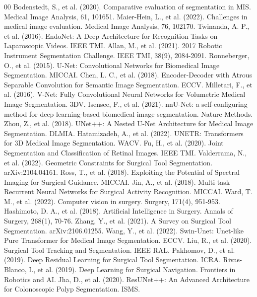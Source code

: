 \documentclass[conference]{IEEEtran}
\begin{document}
\begin{thebibliography}{00}
 Bodenstedt, S., et al. (2020). Comparative evaluation of segmentation in MIS. Medical Image Analysis, 61, 101651.
 Maier-Hein, L., et al. (2022). Challenges in medical image evaluation. Medical Image Analysis, 76, 102170.
 Twinanda, A. P., et al. (2016). EndoNet: A Deep Architecture for Recognition Tasks on Laparoscopic Videos. IEEE TMI.
 Allan, M., et al. (2021). 2017 Robotic Instrument Segmentation Challenge. IEEE TMI, 38(9), 2084-2091.
 Ronneberger, O., et al. (2015). U-Net: Convolutional Networks for Biomedical Image Segmentation. MICCAI.
 Chen, L. C., et al. (2018). Encoder-Decoder with Atrous Separable Convolution for Semantic Image Segmentation. ECCV.
 Milletari, F., et al. (2016). V-Net: Fully Convolutional Neural Networks for Volumetric Medical Image Segmentation. 3DV.
 Isensee, F., et al. (2021). nnU-Net: a self-configuring method for deep learning-based biomedical image segmentation. Nature Methods.
 Zhou, Z., et al. (2018). UNet++: A Nested U-Net Architecture for Medical Image Segmentation. DLMIA.
 Hatamizadeh, A., et al. (2022). UNETR: Transformers for 3D Medical Image Segmentation. WACV.
 Fu, H., et al. (2020). Joint Segmentation and Classification of Retinal Images. IEEE TMI.
 Valderrama, N., et al. (2022). Geometric Constraints for Surgical Tool Segmentation. arXiv:2104.04161.
 Ross, T., et al. (2018). Exploiting the Potential of Spectral Imaging for Surgical Guidance. MICCAI.
 Jin, A., et al. (2018). Multi-task Recurrent Neural Networks for Surgical Activity Recognition. MICCAI.
 Ward, T. M., et al. (2022). Computer vision in surgery. Surgery, 171(4), 951-953.
 Hashimoto, D. A., et al. (2018). Artificial Intelligence in Surgery. Annals of Surgery, 268(1), 70-76.
 Zhang, Y., et al. (2021). A Survey on Surgical Tool Segmentation. arXiv:2106.01255.
 Wang, Y., et al. (2022). Swin-Unet: Unet-like Pure Transformer for Medical Image Segmentation. ECCV.
 Liu, R., et al. (2020). Surgical Tool Tracking and Segmentation. IEEE RAL.
 Pakhomov, D., et al. (2019). Deep Residual Learning for Surgical Tool Segmentation. ICRA.
 Rivas-Blanco, I., et al. (2019). Deep Learning for Surgical Navigation. Frontiers in Robotics and AI.
 Jha, D., et al. (2020). ResUNet++: An Advanced Architecture for Colonoscopic Polyp Segmentation. ISMS.

\end{thebibliography}
\end{document}
